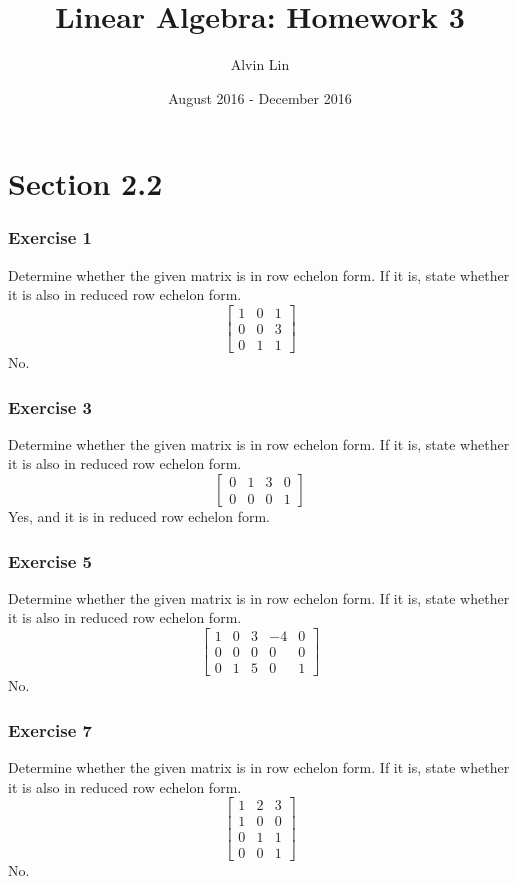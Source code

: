 \documentclass[letterpaper, 12pt]{math}
\title{Linear Algebra: Homework 3}
\author{Alvin Lin}
\date{August 2016 - December 2016}
\begin{document}
\maketitle

\section*{Section 2.2}

\subsubsection*{Exercise 1}
Determine whether the given matrix is in row echelon form. If it is, state
whether it is also in reduced row echelon form.
\[ \begin{bmatrix}
  1 & 0 & 1 \\
  0 & 0 & 3 \\
  0 & 1 & 1
\end{bmatrix} \]
No.

\subsubsection*{Exercise 3}
Determine whether the given matrix is in row echelon form. If it is, state
whether it is also in reduced row echelon form.
\[ \begin{bmatrix}
  0 & 1 & 3 & 0 \\
  0 & 0 & 0 & 1
\end{bmatrix} \]
Yes, and it is in reduced row echelon form.

\subsubsection*{Exercise 5}
Determine whether the given matrix is in row echelon form. If it is, state
whether it is also in reduced row echelon form.
\[ \begin{bmatrix}
  1 & 0 & 3 & -4 & 0 \\
  0 & 0 & 0 & 0 & 0 \\
  0 & 1 & 5 & 0 & 1
\end{bmatrix} \]
No.

\subsubsection*{Exercise 7}
Determine whether the given matrix is in row echelon form. If it is, state
whether it is also in reduced row echelon form.
\[ \begin{bmatrix}
  1 & 2 & 3 \\
  1 & 0 & 0 \\
  0 & 1 & 1 \\
  0 & 0 & 1
\end{bmatrix} \]
No.
\end{document}
